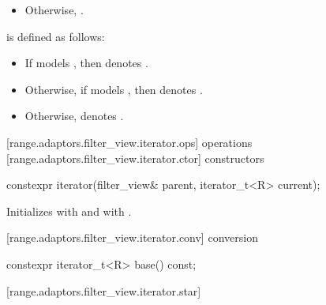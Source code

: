 {\begin{itemize}
\item Otherwise,  
 .
\end{itemize}

{\color{newclr}
\pnum
{} is defined as follows:
\begin{itemize}
\item If  models , then
 denotes .

\item Otherwise, if  models , then
 denotes .

\item Otherwise,  denotes .
\end{itemize}
} %

[range.adaptors.filter_view.iterator.ops]{ operations}
[range.adaptors.filter_view.iterator.ctor]{ constructors}

%
\begin{itemdecl}
constexpr iterator(filter_view& parent, iterator_t<R> current);
\end{itemdecl}

\begin{itemdescr}
\pnum
\effects Initializes  with  and 
with .
\end{itemdescr}

[range.adaptors.filter_view.iterator.conv]{ conversion}

%
\begin{itemdecl}
constexpr iterator_t<R> base() const;
\end{itemdecl}

\begin{itemdescr}
\pnum
\oldtxt{\returns}  
\end{itemdescr}

[range.adaptors.filter_view.iterator.star]{}

}
